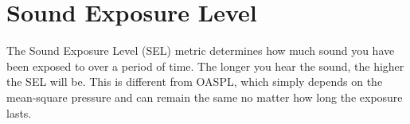 \section{Sound Exposure Level}

The Sound Exposure Level (SEL) metric determines how much sound you have been exposed to over a period of time.
The longer you hear the sound, the higher the SEL will be.
This is different from OASPL, which simply depends on the mean-square pressure and can remain the same no matter how long the exposure lasts.